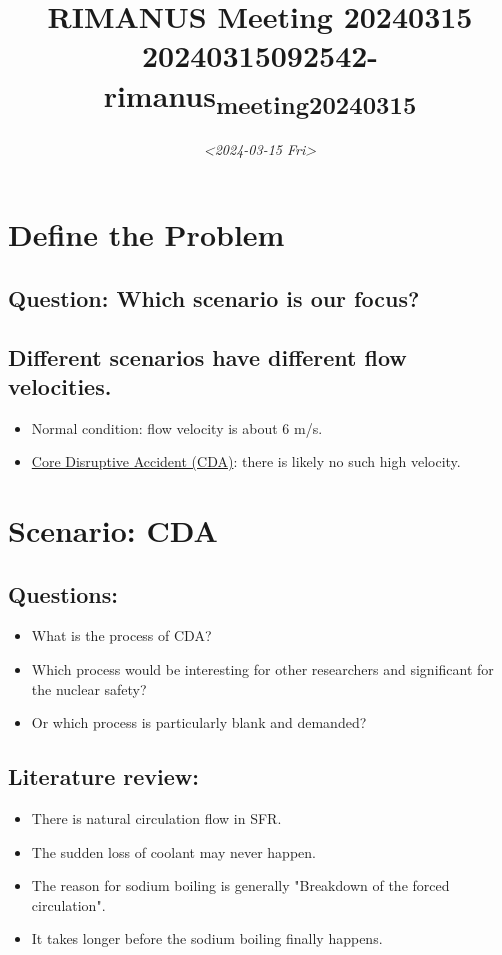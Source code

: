 \documentclass[11pt]{article}
\date{\textit{<2024-03-15 Fri>}}
\title{RIMANUS Meeting 20240315 20240315092542-rimanus\textsubscript{meeting}\textsubscript{20240315}}
\begin{document}
\maketitle

\section{Define the Problem}
\label{sec:org80e9540}
\subsection{Question: Which scenario is our focus?}
\label{sec:orgb5958ee}
\subsection{Different scenarios have different flow velocities.}
\label{sec:orgd90b4d4}
\begin{itemize}
\item Normal condition: flow velocity is about 6 m/s.
\item \href{20240307154931-core_disruptive_accident_cda.org}{Core Disruptive Accident (CDA)}: there is likely no such high velocity.
\end{itemize}
\section{Scenario: CDA}
\label{sec:orgff8161f}
\subsection{Questions:}
\label{sec:orgfd1b176}
\begin{itemize}
\item What is the process of CDA?
\item Which process would be interesting for other researchers and significant for the nuclear safety?
\item Or which process is particularly blank and demanded?
\end{itemize}
\subsection{Literature review:}
\label{sec:orge8fd342}
\begin{itemize}
\item There is natural circulation flow in SFR.
\item The sudden loss of coolant may never happen.
\item The reason for sodium boiling is generally "Breakdown of the forced circulation".
\item It takes longer before the sodium boiling finally happens.
\end{itemize}
\end{document}
